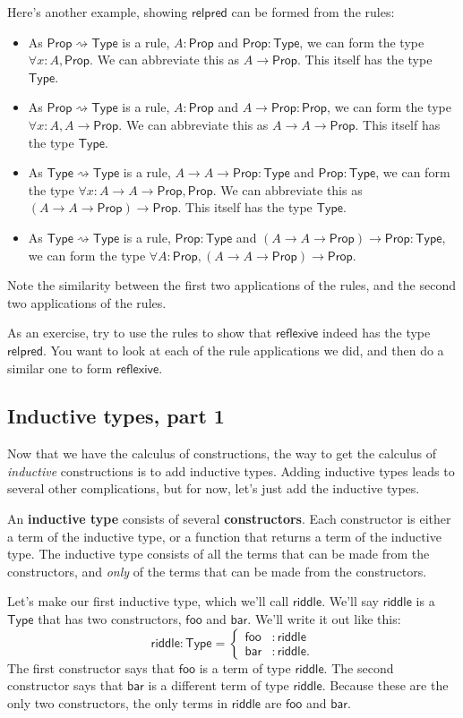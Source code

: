 \documentclass[11pt,paper=letter]{scrartcl}
\newcommand{\sf}{\mathsf}
\newcommand{\prop}{\mathsf{Prop}}
\newcommand{\type}{\mathsf{Type}}
\newcommand{\toto}{\rightsquigarrow}
\begin{document}
Here's another example, showing $\sf{relpred}$ can be formed from the rules:
\begin{itemize}
\item As $\prop \toto \type$ is a rule, $A: \prop$ and $\prop: \type$, we can form the type $\forall x: A, \prop$. We can abbreviate this as $A \to \prop$. This itself has the type $\type$.
\item As $\prop \toto \type$ is a rule, $A: \prop$ and $A \to \prop: \prop$, we can form the type $\forall x: A, A \to \prop$. We can abbreviate this as $A \to A \to \prop$. This itself has the type $\type$.
\item As $\type \toto \type$ is a rule, $A \to A \to \prop : \type$ and $\prop: \type$, we can form the type $\forall x: A \to A \to \prop, \prop$. We can abbreviate this as $(A \to A \to \prop) \to \prop$. This itself has the type $\type$.
\item As $\type \toto \type$ is a rule, $\prop: \type$ and $(A \to A \to \prop) \to \prop: \type$, we can form the type $\forall A: \prop, (A \to A \to \prop) \to \prop$.
\end{itemize}
Note the similarity between the first two applications of the rules, and the second two applications of the rules.

As an exercise, try to use the rules to show that $\sf{reflexive}$ indeed has the type $\sf{relpred}$. You want to look at each of the rule applications we did, and then do a similar one to form $\sf{reflexive}$.

\subsection{Inductive types, part 1}

Now that we have the calculus of constructions, the way to get the calculus of \emph{inductive} constructions is to add inductive types. Adding inductive types leads to several other complications, but for now, let's just add the inductive types.

An \textbf{inductive type} consists of several \textbf{constructors}. Each constructor is either a term of the inductive type, or a function that returns a term of the inductive type. The inductive type consists of all the terms that can be made from the constructors, and \emph{only} of the terms that can be made from the constructors.

Let's make our first inductive type, which we'll call $\sf{riddle}$. We'll say $\sf{riddle}$ is a $\type$ that has two constructors, $\sf{foo}$ and $\sf{bar}$. We'll write it out like this: \[
  \sf{riddle} : \type = \begin{cases}
    \sf{foo}&: \sf{riddle} \\
    \sf{bar}&: \sf{riddle}.
  \end{cases}
\]
The first constructor says that $\sf{foo}$ is a term of type $\sf{riddle}$. The second constructor says that $\sf{bar}$ is a different term of type $\sf{riddle}$. Because these are the only two constructors, the only terms in $\sf{riddle}$ are $\sf{foo}$ and $\sf{bar}$.
\end{document}

